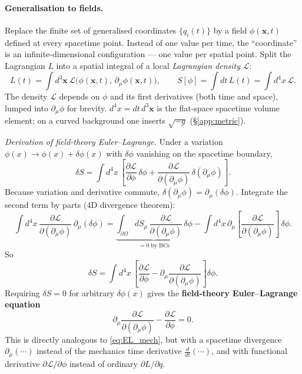 \documentclass[12pt]{article}
\newcommand{\bx}{\mathbf{x}}
\begin{document}
\paragraph{Generalisation to fields.}  Replace the finite set of
generalised coordinates $\{q_i(t)\}$ by a field
$\phi(\bx, t)$ defined at every spacetime point.  Instead of one
value per time, the ``coordinate'' is an infinite-dimensional
configuration --- one value per spatial point.  Split the Lagrangian
$L$ into a spatial integral of a local \emph{Lagrangian density}
$\mathcal L$:
%
\begin{equation}
  L(t) = \int d^3\bx\,\mathcal L\bigl(\phi(\bx,t),\,
                                        \partial_\mu\phi(\bx,t)\bigr),
  \qquad
  S[\phi]
    = \int dt\,L(t)
    = \int d^4x\,\mathcal L.
  \label{eq:action_field}
\end{equation}
%
The density $\mathcal L$ depends on $\phi$ and its first derivatives
(both time and space), lumped into $\partial_\mu\phi$ for brevity.
$d^4x = dt\,d^3\bx$ is the flat-space spacetime volume element; on a
curved background one inserts $\sqrt{-g}$ (\S\ref{app:metric}).

\emph{Derivation of field-theory Euler--Lagrange.}  Under a variation
$\phi(x)\to\phi(x)+\delta\phi(x)$ with $\delta\phi$ vanishing on the
spacetime boundary,
%
\begin{equation}
  \delta S
    = \int d^4x\,\left[
      \frac{\partial\mathcal L}{\partial\phi}\,\delta\phi
      + \frac{\partial\mathcal L}{\partial(\partial_\mu\phi)}\,
        \delta(\partial_\mu\phi)
    \right].
\end{equation}
%
Because variation and derivative commute, $\delta(\partial_\mu\phi) =
\partial_\mu(\delta\phi)$.  Integrate the second term by parts (4D
divergence theorem):
%
\begin{equation}
  \int d^4x\,\frac{\partial\mathcal L}{\partial(\partial_\mu\phi)}\,
    \partial_\mu(\delta\phi)
   = \underbrace{\int_{\partial\Omega}\!
     dS_\mu\,\frac{\partial\mathcal L}{\partial(\partial_\mu\phi)}\,\delta\phi}_{=0\;\text{by BCs}}
     - \int d^4x\,\partial_\mu\!
       \left[\frac{\partial\mathcal L}{\partial(\partial_\mu\phi)}\right]\,\delta\phi.
\end{equation}
%
So
%
\begin{equation}
  \delta S = \int d^4x\,
     \left[
       \frac{\partial\mathcal L}{\partial\phi}
       - \partial_\mu\!\frac{\partial\mathcal L}{\partial(\partial_\mu\phi)}
     \right]\delta\phi.
\end{equation}
%
Requiring $\delta S = 0$ for arbitrary $\delta\phi(x)$ gives the
\textbf{field-theory Euler--Lagrange equation}
%
\begin{equation}
  \partial_\mu\!\frac{\partial\mathcal L}{\partial(\partial_\mu\phi)}
    - \frac{\partial\mathcal L}{\partial\phi} = 0.
  \label{eq:field_EL}
\end{equation}
%
This is directly analogous to \eqref{eq:EL_mech}, but with a
spacetime divergence $\partial_\mu(\cdots)$ instead of the mechanics
time derivative $\frac{d}{dt}(\cdots)$, and with functional
derivative $\partial\mathcal L/\partial\phi$ instead of ordinary
$\partial L/\partial q$.
\end{document}
